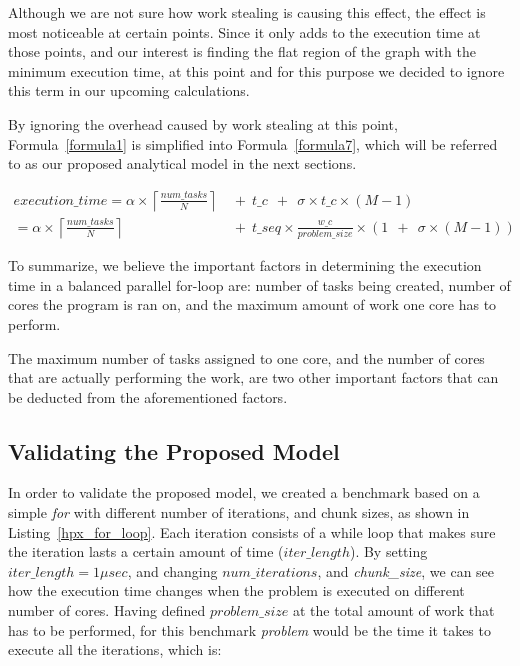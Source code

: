 Although we are not sure how work stealing is causing this effect, the effect is most  noticeable at certain points. Since it only adds to the execution time at those points, and our interest is finding the flat region of the graph with the minimum execution time, at this point and for this purpose we decided to ignore this term in our upcoming calculations. 

By ignoring the overhead caused by work stealing at this point, Formula~\ref{formula1} is simplified into Formula~\ref{formula7}, which will be referred to as our proposed analytical model in the next sections. 

\begin{equation}\label{formula7}
\begin{aligned}
execution\_time = 
\alpha\times{\left\lceil{\frac{num\_{tasks}}{N}}\right\rceil}\:\:&+\:\:t\_c\:\:+\:\:\sigma\times{t\_c}\times{(M-1)}\\
=\alpha\times{\left\lceil{\frac{num\_{tasks}}{N}}\right\rceil}\:\:&+\:\:t\_{seq}\times{\frac{w\_c}{problem\_{size}}}\times{(1\:\:+\:\:\sigma\times{(M-1)})}
\end{aligned}
\end{equation}

To summarize, we believe the important factors in determining the execution time in a balanced parallel for-loop are: number of tasks being created, number of cores the program is ran on, and the maximum amount of work one core has to perform. 

The maximum number of tasks assigned to one core, and the number of cores that are actually performing the work, are two other important factors that can be deducted from the aforementioned factors. 


\vspace{\baselineskip}
\subsection{Validating the Proposed Model}
In order to validate the proposed model, we created a benchmark based on a simple \textit{for} with different number of iterations, and chunk sizes, as shown in Listing~\ref{hpx_for_loop}. 
Each iteration consists of a while loop that makes sure the iteration lasts a certain amount of time ($iter\_{length}$). By setting $iter\_{length}=1\mu{sec}$, and changing $num\_{iterations}$, and \emph{chunk\_{size}}, we can see how the execution time changes when the problem is executed on different number of cores. Having defined $problem\_{size}$ at the total amount of work that has to be performed, for this benchmark \textit{problem} would be the time it takes to execute all the iterations, which is:

